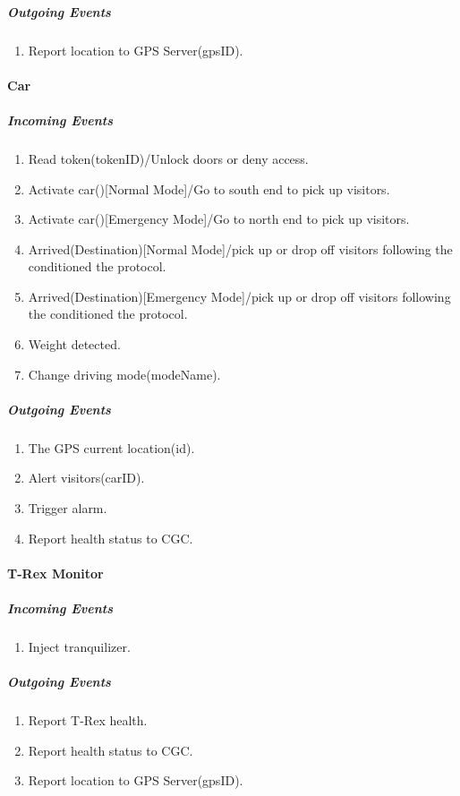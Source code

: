 \documentclass[12pt]{article}
\begin{document}
			\subparagraph{Outgoing Events}
				\begin{enumerate}
					\item Report location to GPS Server(gpsID). 
				\end{enumerate}

		\paragraph{Car}
		\textit{}
			\subparagraph{Incoming Events}
				\begin{enumerate}
					\item Read token(tokenID)/Unlock doors or deny access. 
                    \item Activate car()[Normal Mode]/Go to south end to pick up visitors.
                    \item Activate car()[Emergency Mode]/Go to north end to pick up visitors.
                    \item Arrived(Destination)[Normal Mode]/pick up or drop off visitors following the conditioned the protocol.
                    \item Arrived(Destination)[Emergency Mode]/pick up or drop off visitors following the conditioned the protocol.
					\item Weight detected.
                    \item Change driving mode(modeName).
				\end{enumerate}
				
			\subparagraph{Outgoing Events}
				\begin{enumerate}
                    \item The GPS current location(id).
                    \item Alert visitors(carID).
                    \item Trigger alarm. 
                    \item Report health status to CGC. 
				\end{enumerate}

		\paragraph{T-Rex Monitor}
		\textit{}
			\subparagraph{Incoming Events}
				\begin{enumerate}
					\item Inject tranquilizer. 
				\end{enumerate}
				
			\subparagraph{Outgoing Events}
				\begin{enumerate}
                    \item Report T-Rex health. 
                    \item Report health status to CGC. 
					\item Report location to GPS Server(gpsID). 
				\end{enumerate}
\end{document}
